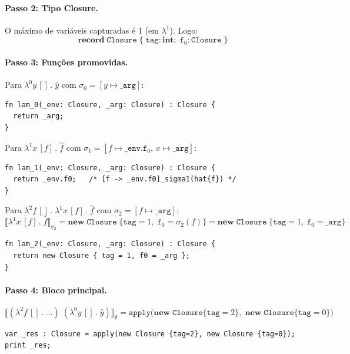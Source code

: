 \paragraph{Passo 2: Tipo Closure.}

O máximo de variáveis capturadas é 1 (em \(\lambda^1\)). Logo:
\[
  \mathbf{record}\;\mathtt{Closure}\;\{\;\mathtt{tag}: \mathbf{int};\;\mathtt{f}_0: \mathtt{Closure}\;\}
\]

\paragraph{Passo 3: Funções promovidas.}

Para \(\lambda^0 y\,[]\,.\;\hat{y}\) com \(\sigma_0 = [y \mapsto \mathtt{\_arg}]\):
\begin{verbatim}
fn lam_0(_env: Closure, _arg: Closure) : Closure {
  return _arg;
}
\end{verbatim}

Para \(\lambda^1 x\,[f]\,.\;\hat{f}\) com \(\sigma_1 = [f \mapsto \mathtt{\_env.f}_0,\, x \mapsto \mathtt{\_arg}]\):
\begin{verbatim}
fn lam_1(_env: Closure, _arg: Closure) : Closure {
  return _env.f0;   /* [f -> _env.f0]_sigma1(hat{f}) */
}
\end{verbatim}

Para \(\lambda^2 f\,[]\,.\;\lambda^1 x\,[f]\,.\;\hat{f}\) com \(\sigma_2 = [f \mapsto \mathtt{\_arg}]\):
\[
  \llbracket \lambda^1 x\,[f]\,.\;\hat{f} \rrbracket_{\sigma_2}
  = \mathbf{new}\;\mathtt{Closure}\;\{\mathtt{tag}=1,\;
    \mathtt{f}_0 = \sigma_2(f)\}
  = \mathbf{new}\;\mathtt{Closure}\;\{\mathtt{tag}=1,\;
    \mathtt{f}_0 = \mathtt{\_arg}\}
\]
\begin{verbatim}
fn lam_2(_env: Closure, _arg: Closure) : Closure {
  return new Closure { tag = 1, f0 = _arg };
}
\end{verbatim}

\paragraph{Passo 4: Bloco principal.}

\[
  \llbracket (\lambda^2 f\,[]\,.\;\ldots)\;(\lambda^0 y\,[]\,.\;\hat{y}) \rrbracket_\emptyset
  = \mathtt{apply}\bigl(
      \mathbf{new}\;\mathtt{Closure}\{\mathtt{tag}=2\},\;
      \mathbf{new}\;\mathtt{Closure}\{\mathtt{tag}=0\}
    \bigr)
\]

\begin{verbatim}
var _res : Closure = apply(new Closure {tag=2}, new Closure {tag=0});
print _res;
\end{verbatim}

